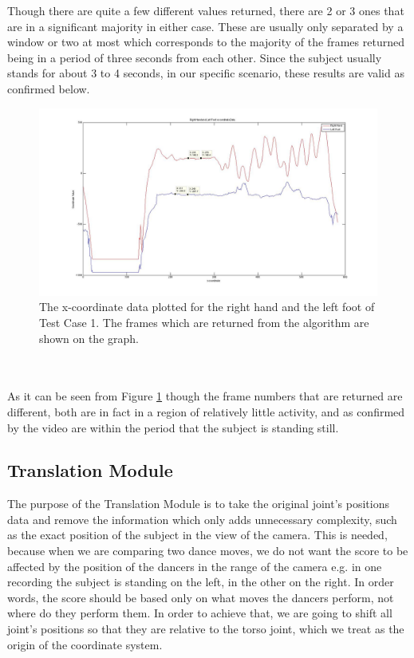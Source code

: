 \documentclass[a4paper]{article}
\begin{document}
\noindent
Though there are quite a few different values returned, there are 2 or 3 ones that are in a significant majority in either case. These are usually only separated by a window or two at most which corresponds to the majority of the frames returned being in a period of three seconds from each other. Since the subject usually stands for about 3 to 4 seconds, in our specific scenario, these results are valid as confirmed below.
\begin{figure}[h]
\center
\includegraphics[scale=0.3]{Motionless_R_Hand_L_Foot_X.jpg} 
\caption{The x-coordinate data plotted for the right hand and the left foot of Test Case 1. The frames which are returned from the algorithm are shown on the graph.}
\label{motionless_rh_lf}
\end{figure}
\\\\
\noindent
As it can be seen from Figure \ref{motionless_rh_lf} though the frame numbers that are returned are different, both are in fact in a region of relatively little activity, and as confirmed by the video are within the period that the subject is standing still. 

\clearpage
\subsection{Translation Module}
\noindent
The purpose of the Translation Module is to take the original joint's positions data and remove the information which only adds unnecessary complexity, such as the exact position of the subject in the view of the camera. This is needed, because when we are comparing two dance moves, we do not want the score to be affected by the position of the dancers in the range of the camera e.g. in one recording the subject is standing on the left, in the other on the right. In order words, the score should be based only on what moves the dancers perform, not where do they perform them. In order to achieve that, we are going to shift all joint's positions so that they are relative to the torso joint, which we treat as the origin of the coordinate system.
\end{document}
